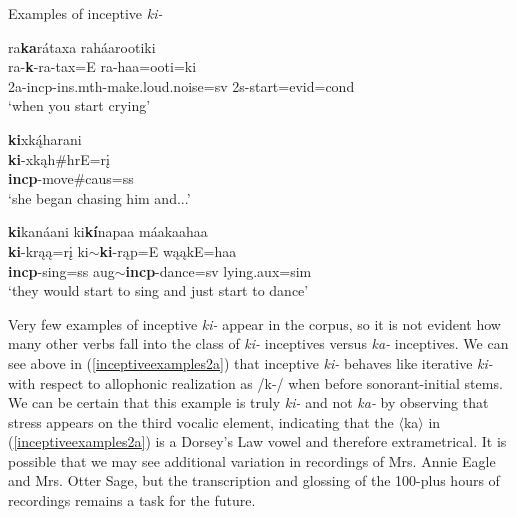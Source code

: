 \begin{exe}
\item\label{inceptiveexamples2} Examples of inceptive \textit{ki-}

	\begin{xlist}
	
	\item\label{inceptiveexamples2a} \glll ra\textbf{ka}rátaxa raháarootiki\\
	ra-\textbf{k}-ra-tax=E ra-haa=ooti=ki\\
	2a-incp-ins.mth-\textnormal{make.loud.noise}=sv 2s-\textnormal{start}=evid=cond\\
	\glt `when you start crying' \citep[185]{hollow1973a}
	
	\item \glll \textbf{ki}xką́harani\\
	\textbf{ki}-xkąh\#hrE=rį\\
	\textbf{incp}-\textnormal{move}\#caus=ss\\
	\glt `she began chasing him and...' \citep[222]{hollow1973a}
	
	\item \glll \textbf{ki}kanáani ki\textbf{kí}napaa máakaahaa\\
	\textbf{ki}-krąą=rį ki$\sim$\textbf{ki}-rąp=E wąąkE=haa\\
	\textbf{incp}-\textnormal{sing}=ss aug$\sim$\textbf{incp}-\textnormal{dance}=sv \textnormal{lying}.aux=sim\\
	\glt `they would start to sing and just start to dance' \citep[165]{trechter2012b}
	
	\end{xlist}

\end{exe}

Very few examples of inceptive \textit{ki-} appear in the corpus, so it is not evident how many other verbs fall into the class of \textit{ki-} inceptives versus \textit{ka-} inceptives. We can see above in (\ref{inceptiveexamples2a}) that inceptive \textit{ki-} behaves like iterative \textit{ki-} with respect to allophonic realization as /k-/ when before sonorant-initial stems. We can be certain that this example is truly \textit{ki-} and not \textit{ka-} by observing that stress appears on the third vocalic element, indicating that the $\langle$ka$\rangle$ in (\ref{inceptiveexamples2a}) is a Dorsey's Law vowel and therefore extrametrical. It is possible that we may see additional variation in  recordings of Mrs. Annie Eagle and Mrs. Otter Sage, but the transcription and glossing of the 100-plus hours of recordings remains a task for the future.

